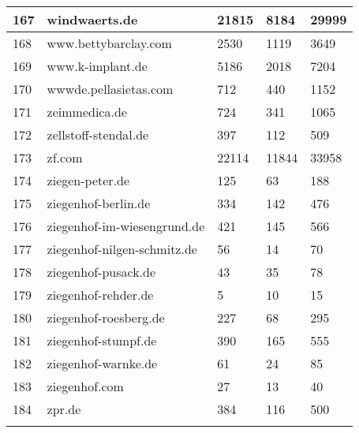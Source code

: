 \begin{longtable}{|m{0.5cm}|m{5cm}|m{2cm}|m{2cm}|m{2cm}|}
	167 & windwaerts.de & 21815 & 8184 & 29999\\
	\hline
	168 & www.bettybarclay.com & 2530 & 1119 & 3649\\
	\hline
	169 & www.k-implant.de & 5186 & 2018 & 7204\\
	\hline
	170 & wwwde.pellasietas.com & 712 & 440 & 1152\\
	\hline
	171 & zeimmedica.de & 724 & 341 & 1065\\
	\hline
	172 & zellstoff-stendal.de & 397 & 112 & 509\\
	\hline
	173 & zf.com & 22114 & 11844 & 33958\\
	\hline
	174 & ziegen-peter.de & 125 & 63 & 188\\
	\hline
	175 & ziegenhof-berlin.de & 334 & 142 & 476\\
	\hline
	176 & ziegenhof-im-wiesengrund.de & 421 & 145 & 566\\
	\hline
	177 & ziegenhof-nilgen-schmitz.de & 56 & 14 & 70\\
	\hline
	178 & ziegenhof-pusack.de & 43 & 35 & 78\\
	\hline
	179 & ziegenhof-rehder.de & 5 & 10 & 15\\
	\hline
	180 & ziegenhof-roesberg.de & 227 & 68 & 295\\
	\hline
	181 & ziegenhof-stumpf.de & 390 & 165 & 555\\
	\hline
	182 & ziegenhof-warnke.de & 61 & 24 & 85\\
	\hline
	183 & ziegenhof.com & 27 & 13 & 40\\
	\hline
	184 & zpr.de & 384 & 116 & 500\\
	\lasthline
\end{longtable}
%
